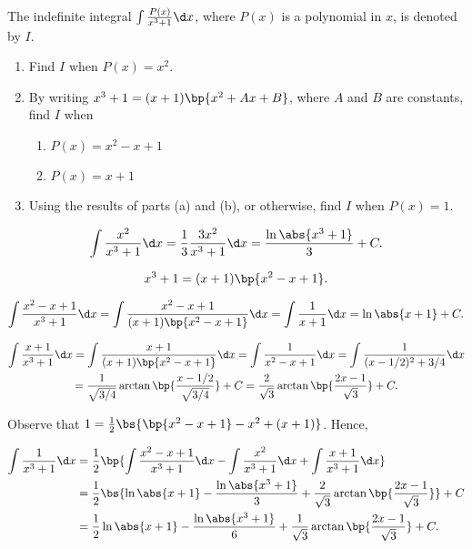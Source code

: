 \clearpage
\begin{problem}
    The indefinite integral $\int \frac{P(x)}{x^3 + 1} \d x$, where $P(x)$ is a polynomial in $x$, is denoted by $I$.
        
    \begin{enumerate}
        \item Find $I$ when $P(x) = x^2$.
        \item By writing $x^3 + 1 = (x+1)\bp{x^2 + Ax + B}$, where $A$ and $B$ are constants, find $I$ when
        \begin{enumerate}
            \item $P(x) = x^2 - x + 1$
            \item $P(x) = x + 1$
        \end{enumerate}
        \item Using the results of parts (a) and (b), or otherwise, find $I$ when $P(x) = 1$.
    \end{enumerate}
\end{problem}
\begin{solution}
    \begin{ppart}
        \[\int \frac{x^2}{x^3 + 1} \d x = \frac13 \frac{3x^2}{x^3 + 1} \d x = \frac{\ln \abs{x^3 + 1}}3 + C.\]
    \end{ppart}
    \begin{ppart}
        \[x^3 + 1 = (x+1)\bp{x^2 - x + 1}.\]
        \begin{psubpart}
            \[\int \frac{x^2 - x + 1}{x^3 + 1} \d x = \int \frac{x^2 - x + 1}{(x+1)\bp{x^2 - x + 1}} \d x = \int \frac1{x+1} \d x = \ln \abs{x+1} + C.\]
        \end{psubpart}
        \begin{psubpart}
            \begin{gather*}
                \int \frac{x+1}{x^3 + 1} \d x = \int \frac{x+1}{(x+1)\bp{x^2 - x + 1}} \d x = \int \frac1{x^2 - x + 1} \d x = \int \frac1{(x-1/2)^2 + 3/4} \d x\\
                = \frac1{\sqrt{3/4}} \arctan \bp{ \frac{x - 1/2}{\sqrt{3/4}}} + C = \frac2{\sqrt3}\arctan \bp{\frac{2x-1}{\sqrt3}} + C.
            \end{gather*}
        \end{psubpart}
    \end{ppart}
    \begin{ppart}
        Observe that $1 = \frac12 \bs{\bp{x^2 - x + 1} - x^2 + (x+1)}$. Hence,

        \begin{align*}
            \int \frac1{x^3 + 1} \d x &= \frac12\bp{\int\frac{x^2 - x + 1}{x^3 + 1} \d x - \int\frac{x^2}{x^3 + 1} \d x + \int\frac{x+1}{x^3 + 1} \d x}\\
            &= \frac12 \bs{\ln \abs{x+1} - \frac{\ln\abs{x^3 + 1}}3 + \frac2{\sqrt3}\arctan \bp{\frac{2x-1}{\sqrt3}}} + C\\
            &= \frac12\ln \abs{x+1} - \frac{\ln\abs{x^3 + 1}}6 + \frac1{\sqrt3}\arctan \bp{\frac{2x-1}{\sqrt3}} + C.
        \end{align*}
    \end{ppart}
\end{solution}